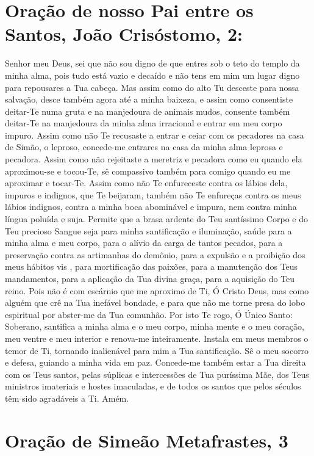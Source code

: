\documentclass{subfiles}
\begin{document}
\section*{Oração de nosso Pai entre os Santos, João Crisóstomo, 2:}

Senhor meu Deus, sei que não sou digno de que entres sob o teto do templo da
minha alma, pois tudo está vazio e decaído e não tens em mim um lugar digno para
repousares a Tua cabeça. Mas assim como do alto Tu desceste para nossa salvação,
desce também agora até a minha baixeza, e assim como consentiste deitar-Te numa
gruta e na manjedoura de animais mudos, consente também deitar-Te na manjedoura
da minha alma irracional e entrar em meu corpo impuro. Assim como não Te
recusaste a entrar e ceiar com os pecadores na casa de Simão, o leproso,
concede-me entrares na casa da minha alma leprosa e pecadora. Assim como não
rejeitaste a meretriz e pecadora como eu quando ela aproximou-se e tocou-Te, sê
compassivo também para comigo quando eu me aproximar e tocar-Te. Assim como não
Te enfureceste contra os lábios dela, impuros e indignos, que Te beijaram,
também não Te enfureças contra os meus lábios indignos, contra a minha boca
abominável e impura, nem contra minha língua poluída e suja. Permite que a brasa
ardente do Teu santíssimo Corpo e do Teu precioso Sangue seja para minha
santificação e iluminação, saúde para a minha alma e meu corpo, para o alívio da
carga de tantos pecados, para a preservação contra as artimanhas do demônio,
para a expulsão e a proibição dos meus hábitos vis , para mortificação das
paixões, para a manutenção dos Teus mandamentos, para a aplicação da Tua divina
graça, para a aquisição do Teu reino. Pois não é com escárnio que me aproximo de
Ti, Ó Cristo Deus, mas como alguém que crê na Tua inefável bondade, e para que
não me torne presa do lobo espiritual por abster-me da Tua comunhão. Por isto Te
rogo, Ó Único Santo: Soberano, santifica a minha alma e o meu corpo, minha mente
e o meu coração, meu ventre e meu interior e renova-me inteiramente. Instala em
meus membros o temor de Ti, tornando inalienável para mim a Tua santificação. Sê
o meu socorro e defesa, guiando a minha vida em paz. Concede-me também estar a
Tua direita com os Teus santos, pelas súplicas e intercessões de Tua puríssima
Mãe, dos Teus ministros imateriais e hostes imaculadas, e de todos os santos que
pelos séculos têm sido agradáveis a Ti. Amém.

\section*{Oração de Simeão Metafrastes, 3}
\end{document}
